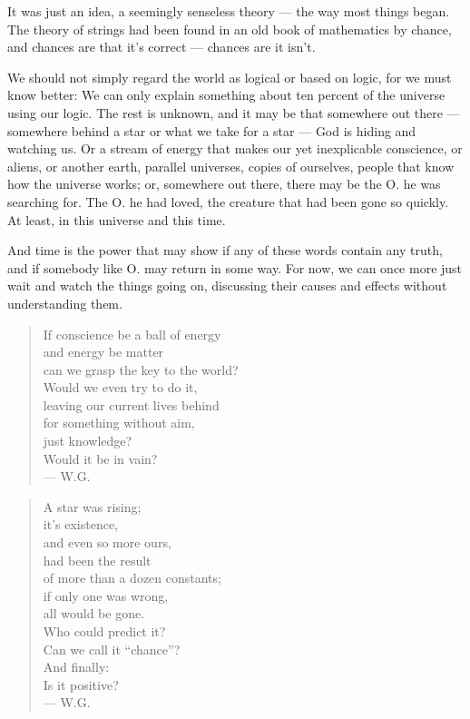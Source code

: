 It was just an idea, a seemingly senseless theory --- the way most things began. The theory of strings had been found in an old book of mathematics by chance, and chances are that it's correct --- chances are it isn't.

We should not simply regard the world as logical or based on logic, for we must know better: We can only explain something about ten percent of the universe using our logic. The rest is unknown, and it may be that somewhere out there --- somewhere behind a star or what we take for a star --- God is hiding and watching us. Or a stream of energy that makes our yet inexplicable conscience, or aliens, or another earth, parallel universes, copies of ourselves, people that know how the universe works; or, somewhere out there, there may be the O. he was searching for. The O. he had loved, the creature that had been gone so quickly.
At least, in this universe and this time.

And time is the power that may show if any of these words contain any truth, and if somebody like O. may return in some way. 
For now, we can once more just wait and watch the things going on, discussing their causes and effects without understanding them. 

\begin{quote}
If conscience be a ball of energy \\
and energy be matter \\
can we grasp the key to the world? \\
Would we even try to do it, \\
leaving our current lives behind \\
for something without aim, \\
just knowledge? \\
Would it be in vain? \\
--- W.G.
\end{quote}

\begin{quote}
A star was rising; \\
it's existence, \\
and even so more ours, \\
had been the result \\
of more than a dozen constants; \\
if only one was wrong, \\
all would be gone. \\
Who could predict it? \\
Can we call it \enquote{chance}? \\
And finally: \\
Is it positive? \\
--- W.G.
\end{quote}
